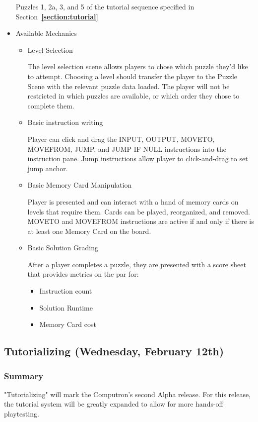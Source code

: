 \begin{itemize}
  Puzzles 1, 2a, 3, and 5 of the tutorial sequence specified in Section~\textbf{\ref{section:tutorial}}

  \item Available Mechanics
  \begin{itemize}
    \item Level Selection
    
    The level selection scene allows players to chose which puzzle they'd like to attempt. Choosing a level should transfer the player to the Puzzle Scene with the relevant puzzle data loaded. The player will not be restricted in which puzzles are available, or which order they chose to complete them.

    \item Basic instruction writing
    
    Player can click and drag the INPUT, OUTPUT, MOVETO, MOVEFROM, JUMP, and JUMP IF NULL instructions into the instruction pane. Jump instructions allow player to click-and-drag to set jump anchor.

    \item Basic Memory Card Manipulation
    
    Player is presented and can interact with a hand of memory cards on levels that require them. Cards can be played, reorganized, and removed. MOVETO and MOVEFROM instructions are active if and only if there is at least one Memory Card on the board.

    \item Basic Solution Grading
    
    After a player completes a puzzle, they are presented with a score sheet that provides metrics on the par for:
    \begin{itemize}
      \item Instruction count
      \item Solution Runtime
      \item Memory Card cost
    \end{itemize}
  \end{itemize}
\end{itemize}

\subsection{Tutorializing (Wednesday, February 12th)}

\subsubsection*{Summary}
"Tutorializing" will mark the Computron's second Alpha release. For this release, the tutorial system will be greatly expanded to allow for more hands-off playtesting.

